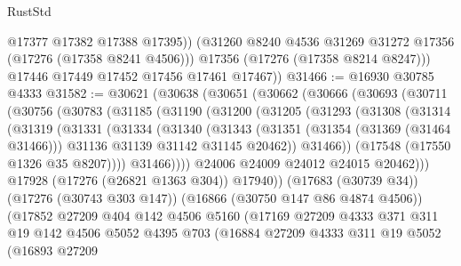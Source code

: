 \begin{lexlean}{RustStd}
\begin{coremodule}
              @17377
              @17382
              @17388
              @17395))
          (@31260 @8240 @4536 @31269 @31272 @17356 (@17276 (@17358 @8241 @4506)))
          @17356
          (@17276 (@17358 @8214 @8247)))
        @17446
        @17449
        @17452
        @17456
        @17461
        @17467))
@31466 := @16930 @30785 @4333
@31582 := @30621
    (@30638
      (@30651
        (@30662
          (@30666
            (@30693
              (@30711
                (@30756
                  (@30783
                    (@31185
                      (@31190
                        (@31200
                          (@31205
                            (@31293
                              (@31308
                                (@31314
                                  (@31319
                                    (@31331
                                      (@31334
                                        (@31340
                                          (@31343
                                            (@31351
                                              (@31354 (@31369 (@31464 @31466)))
                                              @31136
                                              @31139
                                              @31142
                                              @31145
                                              @20462))
                                          @31466))
                                      (@17548 (@17550 @1326 @35 @8207))))
                                  @31466))))
                          @24006
                          @24009
                          @24012
                          @24015
                          @20462)))
                    @17928
                    (@17276 (@26821 @1363 @304))
                    @17940))
                (@17683 (@30739 @34))
                (@17276 (@30743 @303 @147))
                (@16866 (@30750 @147 @86 @4874 @4506))
                (@17852
                  @27209
                  @404
                  @142
                  @4506
                  @5160
                  (@17169
                    @27209
                    @4333
                    @371
                    @311
                    @19
                    @142
                    @4506
                    @5052
                    @4395
                    @703
                    (@16884
                      @27209
                      @4333
                      @311
                      @19
                      @5052
                      (@16893
                        @27209

\end{coremodule}
\end{lexlean}
